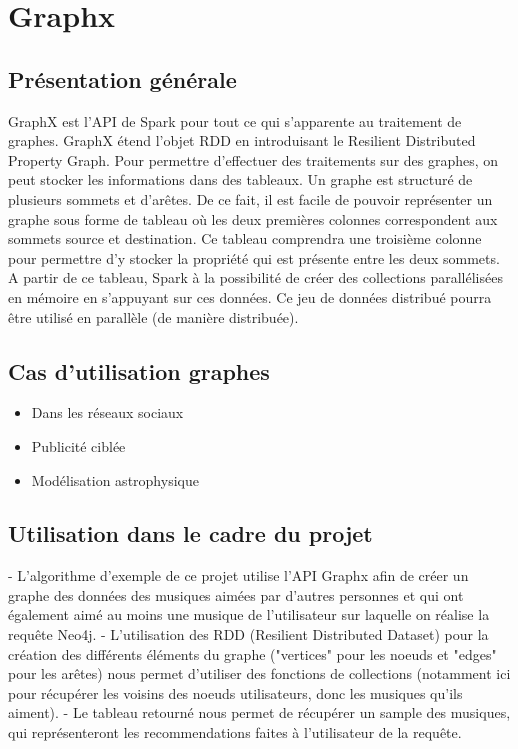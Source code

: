 \section{Graphx}

\subsection{Présentation générale}

GraphX est l'API de Spark pour tout ce qui s'apparente au traitement de graphes. GraphX étend l'objet RDD en introduisant le Resilient Distributed Property Graph. Pour permettre d'effectuer des traitements sur des graphes, on peut stocker les informations dans des tableaux.
Un graphe est structuré de plusieurs sommets et d'arêtes. De ce fait, il est facile de pouvoir représenter un graphe sous forme de tableau où les deux premières colonnes correspondent aux sommets source et destination. Ce tableau comprendra une troisième colonne pour permettre d'y stocker la propriété qui est présente entre les deux sommets. 
A partir de ce tableau, Spark à la possibilité de créer des collections parallélisées en mémoire en s'appuyant sur ces données. Ce jeu de données distribué pourra être utilisé en parallèle (de manière distribuée).

\subsection{Cas d'utilisation graphes}

\begin{itemize}
      \item Dans les réseaux sociaux
      \item Publicité ciblée
      \item Modélisation astrophysique
\end{itemize}

\subsection{Utilisation dans le cadre du projet}
- L'algorithme d'exemple de ce projet utilise l'API Graphx afin de créer un graphe des données des musiques aimées par d'autres personnes et qui ont également aimé au moins une musique de l'utilisateur sur laquelle on réalise la requête Neo4j.
- L'utilisation des RDD (Resilient Distributed Dataset) pour la création des différents éléments du graphe ("vertices" pour les noeuds et "edges" pour les arêtes) nous permet d'utiliser des fonctions de collections (notamment ici pour récupérer les voisins des noeuds utilisateurs, donc les musiques qu'ils aiment).
- Le tableau retourné nous permet de récupérer un sample des musiques, qui représenteront les recommendations faites à l'utilisateur de la requête.